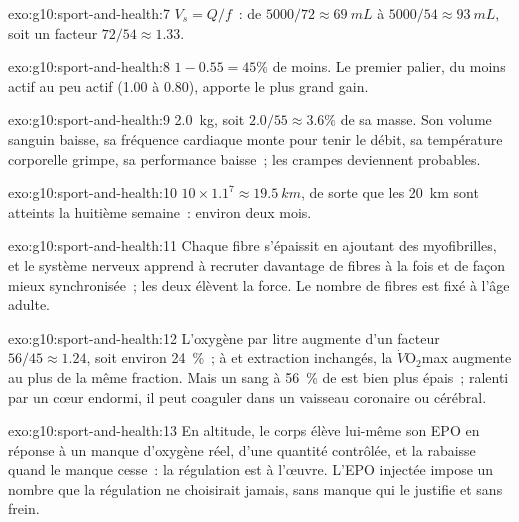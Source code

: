 \begin{solution}{exo:g10:sport-and-health:7}
$V_s = Q/f$~: de $5000/72 \approx \qty{69}{mL}$ à $5000/54 \approx
\qty{93}{mL}$, soit un facteur $72/54 \approx 1.33$.
\end{solution}

\begin{solution}{exo:g10:sport-and-health:8}
$1 - 0.55 = 45\%$ de moins. Le premier palier, du moins actif au peu
actif (1.00 à 0.80), apporte le plus grand gain.
\end{solution}

\begin{solution}{exo:g10:sport-and-health:9}
\qty{2.0}{kg}, soit $2.0/55 \approx 3.6\%$ de sa masse. Son volume
sanguin baisse, sa fréquence cardiaque monte pour tenir le débit, sa
température corporelle grimpe, sa performance baisse~; les crampes
deviennent probables.
\end{solution}

\begin{solution}{exo:g10:sport-and-health:10}
$10 \times 1.1^7 \approx \qty{19.5}{km}$, de sorte que les
\qty{20}{km} sont atteints la huitième semaine~: environ deux mois.
\end{solution}

\begin{solution}{exo:g10:sport-and-health:11}
Chaque fibre s'épaissit en ajoutant des myofibrilles, et le système
nerveux apprend à recruter davantage de fibres à la fois et de façon
mieux synchronisée~; les deux élèvent la force. Le nombre de fibres est
fixé à l'âge adulte.
\end{solution}

\begin{solution}{exo:g10:sport-and-health:12}
L'oxygène par litre augmente d'un facteur $56/45 \approx 1.24$, soit
environ 24~\%~; à  et extraction inchangés, la
$\dot V\!\mathrm{O_2}$max augmente au plus de la même fraction. Mais un
sang à 56~\% de  est bien plus épais~; ralenti par un cœur
endormi, il peut coaguler dans un vaisseau coronaire ou cérébral.
\end{solution}

\begin{solution}{exo:g10:sport-and-health:13}
En altitude, le corps élève lui-même son EPO en réponse à un manque
d'oxygène réel, d'une quantité contrôlée, et la rabaisse quand le
manque cesse~: la régulation est à l'œuvre. L'EPO injectée impose un
nombre que la régulation ne choisirait jamais, sans manque qui le
justifie et sans frein.
\end{solution}

